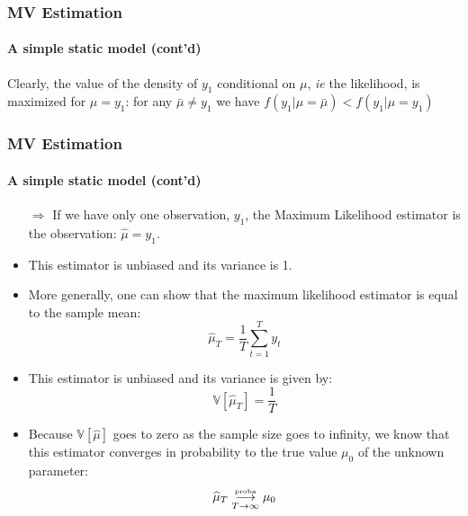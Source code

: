 \documentclass[10pt,slidestop]{beamer}
\begin{document}
\begin{frame}
  \frametitle{MV Estimation}
  \framesubtitle{A simple static model (cont'd)}
  \begin{center}
    \begin{tikzpicture}
      
    \end{tikzpicture}
  \end{center}
  {\small Clearly, the value of the density of $y_1$ conditional on
    $\mu$, \emph{ie} the likelihood, is maximized for $\mu=y_1$: for
  any $\bar\mu\neq y_1$ we have $f(y_1|\mu=\bar\mu)<f(y_1|\mu=y_1)$}
\end{frame}


\begin{frame}
  \frametitle{MV Estimation}
  \framesubtitle{A simple static model (cont'd)}
  \begin{itemize}
  \item[$\Rightarrow$] If we have only one observation, $y_1$, the
    Maximum Likelihood estimator is the observation:
    $\widehat{\mu} = y_1$.
    \item This estimator is unbiased and its variance is 1.
      \bigskip
    \item More generally, one can show that the maximum likelihood
      estimator is equal to the sample mean:
      \begin{equation}
        \label{eq:simple-static-model:2}\tag{2-c}
        \widehat{\mu}_{T} = \frac{1}{T}\sum_{t=1}^Ty_t
      \end{equation}
    \item This estimator is unbiased and its variance is given by:
      \begin{equation}
        \label{eq:simple-static-model:2}\tag{2-d}
        \mathbb V\left[\widehat{\mu}_{T}\right] = \frac{1}{T}
      \end{equation}
      \item Because $\mathbb V\left[\widehat{\mu}\right]$ goes to
        zero as the sample size goes to infinity, we know that this
        estimator converges in probability to the true value $\mu_0$
        of the unknown parameter:
        \[
        \widehat{\mu}_{T}\overset{\text{\tiny{proba}}}{\underset{T\rightarrow\infty}{\longrightarrow}} \mu_0
        \]
  \end{itemize}
\end{frame}
\end{document}
